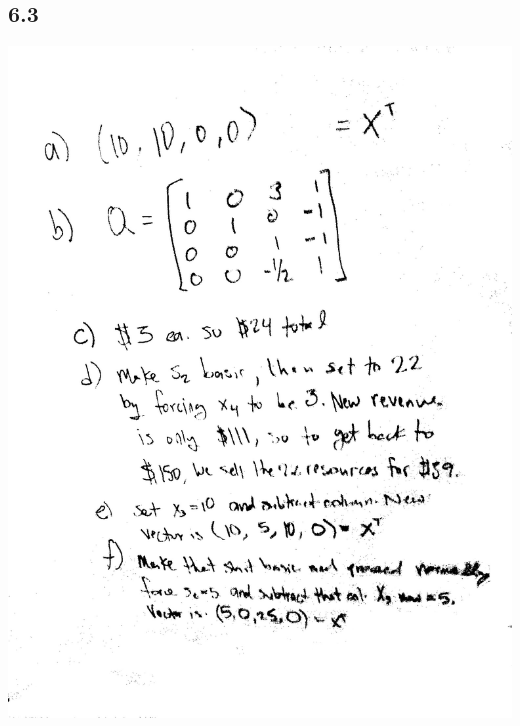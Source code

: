 \documentclass[a4paper,12pt]{article}
\begin{document}
\begin{center}
\section*{6.3}
\includegraphics[width=7in, height=7in, keepaspectratio=true]{image/sixthree1.jpg}\\

\end{center}
\end{document}
